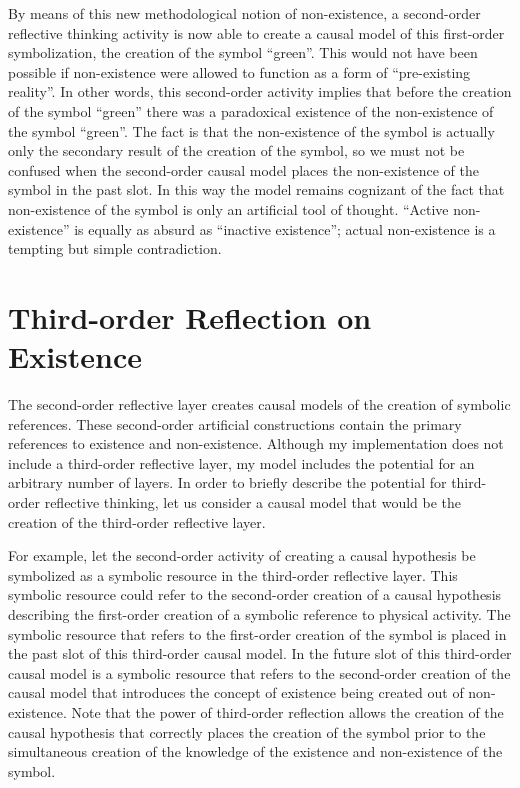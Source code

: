 By means of this new methodological notion of non-existence, a
second-order reflective thinking activity is now able to create a
causal model of this first-order symbolization, the creation of the
symbol ``green''.  This would not have been possible if non-existence
were allowed to function as a form of ``pre-existing reality''.  In
other words, this second-order activity implies that before the
creation of the symbol ``green'' there was a paradoxical existence of
the non-existence of the symbol ``green''.  The fact is that the
non-existence of the symbol is actually only the secondary result of
the creation of the symbol, so we must not be confused when the
second-order causal model places the non-existence of the symbol in
the past slot.  In this way the model remains cognizant of the fact
that non-existence of the symbol is only an artificial tool of
thought.  ``Active non-existence'' is equally as absurd as ``inactive
existence''; actual non-existence is a tempting but simple
contradiction.

\section{Third-order Reflection on Existence}

The second-order reflective layer creates causal models of the
creation of symbolic references.  These second-order artificial
constructions contain the primary references to existence and
non-existence.  Although my implementation does not include a
third-order reflective layer, my model includes the potential for an
arbitrary number of layers.  In order to briefly describe the
potential for third-order reflective thinking, let us consider a
causal model that would be the creation of the third-order reflective
layer.

For example, let the second-order activity of creating a causal
hypothesis be symbolized as a symbolic resource in the third-order
reflective layer.  This symbolic resource could refer to the
second-order creation of a causal hypothesis describing the
first-order creation of a symbolic reference to physical activity.
The symbolic resource that refers to the first-order creation of the
symbol is placed in the past slot of this third-order causal model.
In the future slot of this third-order causal model is a symbolic
resource that refers to the second-order creation of the causal model
that introduces the concept of existence being created out of
non-existence.  Note that the power of third-order reflection allows
the creation of the causal hypothesis that correctly places the
creation of the symbol prior to the simultaneous creation of the
knowledge of the existence and non-existence of the symbol.

